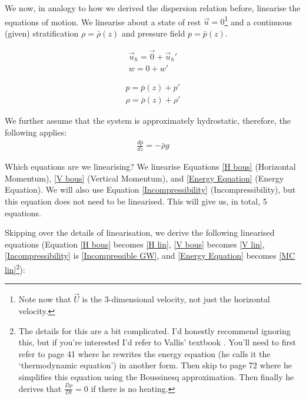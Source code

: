 We now, in analogy to how we derived the dispersion relation before, linearise the equations of motion. We linearise about a state of rest $\vec{u}=0$\footnote{Note now that $\vec{U}$ is the 3-dimensional velocity, not just the horizontal velocity.} and a continuous (given) stratification $\rho=\bar{\rho}(z)$ and pressure field $p=\bar{p}(z)$.

\begin{minipage}{0.48\linewidth}
    \begin{align*}
        \vec{u}_h = \vec{0}+\vec{u}_h'\\
        w = 0 + w'
    \end{align*}
\end{minipage}
\hfill
\begin{minipage}{0.48\linewidth}
    \begin{align*}
        p = \bar{p}(z)+p'\\
        \rho = \bar{\rho}(z) + \rho'
    \end{align*}
\end{minipage}

We further assume that the system is approximately hydrostatic, therefore, the following applies:
\begin{align*}
    \frac{d\bar{p}}{dz}=-\bar{\rho}g
\end{align*}

Which equations are we linearising? We linearise Equations \ref{H bous} (Horizontal Momentum), \ref{V bous} (Vertical Momentum), and \ref{Energy Equation} (Energy Equation). We will also use Equation \ref{Incompressibility} (Incompressibility), but this equation does not need to be linearised. This will give us, in total, 5 equations.

Skipping over the details of linearisation, we derive the following linearised equations (Equation \ref{H bous} becomes \ref{H lin}, \ref{V bous} becomes \ref{V lin}, \ref{Incompressibility} is \ref{Incompressible GW}, and \ref{Energy Equation} becomes \ref{MC lin}\footnote{
    The details for this are a bit complicated. I'd honestly recommend ignoring this, but if you're interested I'd refer to Vallis' textbook \cite{Vallis}. You'll need to first refer to page 41 where he rewrites the energy equation (he calls it the `thermodynamic equation') in another form. Then skip to page 72 where he simplifies this equation using the Boussinesq approximation. Then finally he derives that $\frac{D\rho}{Dt}=0$ if there is no heating.
 }):

